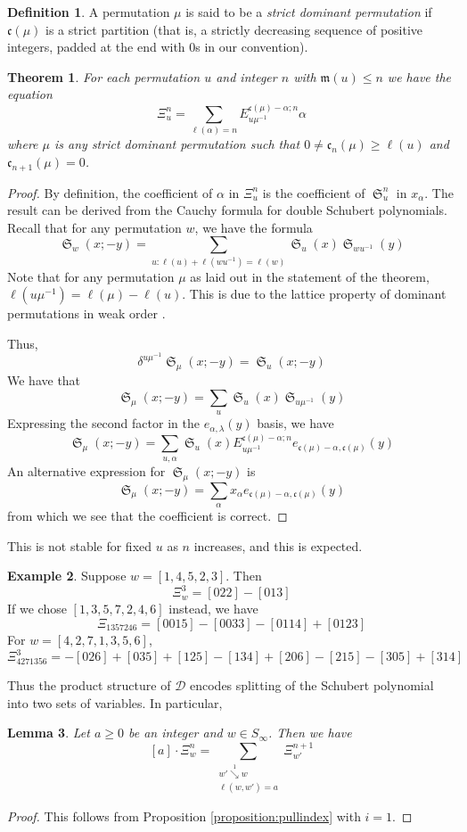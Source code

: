\documentclass[a4paper,fleqn]{cas-sc}
\newtheorem{lemma}{Lemma}[subsection]
\newtheorem{theorem}{Theorem}[section]
\theoremstyle{definition}
\newtheorem{definition}[lemma]{Definition}
\newtheorem{example}[lemma]{Example}
\theoremstyle{remark}
\numberwithin{equation}{subsection}
\DeclareMathOperator{\sch}{\mathfrak{S}}
\newcommand{\downvar}[1]{\stackrel{#1}{\searrow}}
\newcommand{\dsch}{\ensuremath{\Xi}}
\newcommand{\dcoma}{\mathcal{D}}
\newcommand{\code}{\mathfrak{c}}
\newcommand{\maxd}{\mathfrak{m}}
\begin{document}
\begin{definition}
A permutation $\mu$ is said to be a \emph{strict dominant permutation} if $\code(\mu)$ is a strict partition (that is, a strictly decreasing sequence of positive integers, padded at the end with $0$s in our convention).
\end{definition}

\begin{theorem}
	For each permutation $u$ and integer $n$ with $\maxd(u)\leq n$ we have the equation
	$$\dsch_u^{n} = \sum_{\ell(\alpha)=n} E^{\code(\mu)-\alpha;n}_{u\mu^{-1}}\alpha$$
	where $\mu$ is any strict dominant permutation such that $0\neq \code_n(\mu) \geq \ell(u)$ and $\code_{n+1}(\mu)=0$.
\end{theorem}
\begin{proof}
	By definition, the coefficient of $\alpha$ in $\dsch_u^n$ is the coefficient of $\sch_u^n$ in $x_\alpha$. The result can be derived from the Cauchy formula for double Schubert polynomials. Recall that for any permutation $w$, we have the formula
  $$\sch_w(x;-y) = \sum_{u:\ell(u)+\ell(wu^{-1})=\ell(w)} \sch_u(x)\sch_{wu^{-1}}(y)$$
  Note that for any permutation $\mu$ as laid out in the statement of the theorem, $\ell(u\mu^{-1})=\ell(\mu)-\ell(u)$. This is due to the lattice property of dominant permutations in weak order \cite{bjorner1997shellable}.

  Thus,
	$$\delta^{u\mu^{-1}}\sch_\mu(x;-y) = \sch_u(x;-y)$$
	We have that
	$$\sch_\mu(x;-y)=\sum_u \sch_u(x)\sch_{u\mu^{-1}}(y)$$
	Expressing the second factor in the $e_{\alpha,\lambda}(y)$ basis, we have
	$$\sch_\mu(x;-y)=\sum_{u,\alpha} \sch_u(x)E_{u\mu^{-1}}^{\code(\mu)-\alpha;n}e_{\code(\mu)-\alpha,\code(\mu)}(y)$$
	An alternative expression for $\sch_\mu(x;-y)$ is
	$$\sch_\mu(x;-y)=\sum_{\alpha} x_\alpha e_{\code(\mu)-\alpha,\code(\mu)}(y)$$
	from which we see that the coefficient is correct.
\end{proof}


This is not stable for fixed $u$ as $n$ increases, and this is expected.


\begin{example}
Suppose $w = [1,4,5,2,3]$. Then
$$\dsch_w^3 = [022] - [013]$$
If we chose $[1,3,5,7,2,4,6]$ instead, we have
$$\dsch_{1357246} = [0015] - [0033] - [0114] + [0123]$$
For $w=[4,2,7,1,3,5,6]$,
$$\dsch_{4271356}^3 = -[026] + [035] + [125] - [134] + [206] - [215] - [305] + [314]$$
\end{example}

Thus the product structure of $\dcoma$ encodes splitting of the Schubert polynomial into two sets of variables. In particular,
\begin{lemma} \label{lemma:dpieri}
Let $a\geq 0$ be an integer and $w\in S_\infty$. Then we have
$$[a]\cdot \dsch_{w}^{n} = \sum_{\substack{w'\downvar{1} w\\ \ell(w,w')=a}} \dsch_{w'}^{n+1}$$
\end{lemma}
\begin{proof}
  This follows from Proposition \ref{proposition:pullindex} with $i=1$.
\end{proof}
\end{document}
